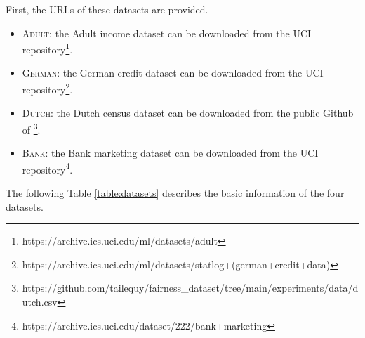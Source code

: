 \documentclass[10pt]{article} %
\begin{document}
First, the URLs of these datasets are provided.

\begin{itemize}

    \item 
    \textsc{Adult}:
    the Adult income dataset \citep{Dua:2019} can be downloaded from the UCI repository\footnote{https://archive.ics.uci.edu/ml/datasets/adult}.

    \item 
    \textsc{German}:
    the German credit dataset \citep{Dua:2019} can be downloaded from the UCI repository\footnote{https://archive.ics.uci.edu/ml/datasets/statlog+(german+credit+data)}.

    \item 
    \textsc{Dutch}:
    the Dutch census dataset can be downloaded from the public Github of \citet{Le_Quy_2022} \footnote{https://github.com/tailequy/fairness\_dataset/tree/main/experiments/data/dutch.csv}.

    \item 
    \textsc{Bank}:
    the Bank marketing dataset can be downloaded from the UCI repository\footnote{https://archive.ics.uci.edu/dataset/222/bank+marketing}.

\end{itemize}

The following Table \ref{table:datasets} describes the basic information of the four datasets.
\end{document}
